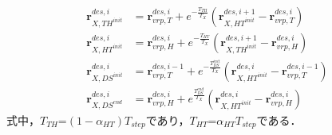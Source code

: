 \documentclass[twocolumn]{jsarticle}
\begin{document}
\begin{align}
\bm{r}_{X,TH^{init}}^{des,i}
  &=\bm{r}_{vrp,T}^{des,i}
  +e^{-\frac{T_{TH}}{T_X}}(\bm{r}_{X,HT^{init}}^{des,i+1}-\bm{r}_{vrp,T}^{des,i})\nonumber\\
 \bm{r}_{X,HT^{init}}^{des,i}
  &=\bm{r}_{vrp,H}^{des,i}
  +e^{-\frac{T_{HT}}{T_X}}(\bm{r}_{X,TH^{init}}^{des,i+1}-\bm{r}_{vrp,H}^{des,i})\nonumber\\
  \bm{r}_{X,DS^{init}}^{des,i}
  &=\bm{r}_{vrp,T}^{des,i-1}
  +e^{-\frac{T_{DS}^{init}}{T_X}}(\bm{r}_{X,HT^{init}}^{des,i}-\bm{r}_{vrp,T}^{des,i-1})\nonumber\\
  \bm{r}_{X,DS^{end}}^{des,i}
  &=\bm{r}_{vrp,H}^{des,i}
    +e^{\frac{T_{DS}^{end}}{T_X}}(\bm{r}_{X,HT^{init}}^{des,i}-\bm{r}_{vrp,H}^{des,i})\nonumber
\end{align}
式中，$T_{TH}$=$(1-\alpha_{HT})T_{step}$であり，$T_{HT}$=$\alpha_{HT}T_{step}$である．
\end{document}
